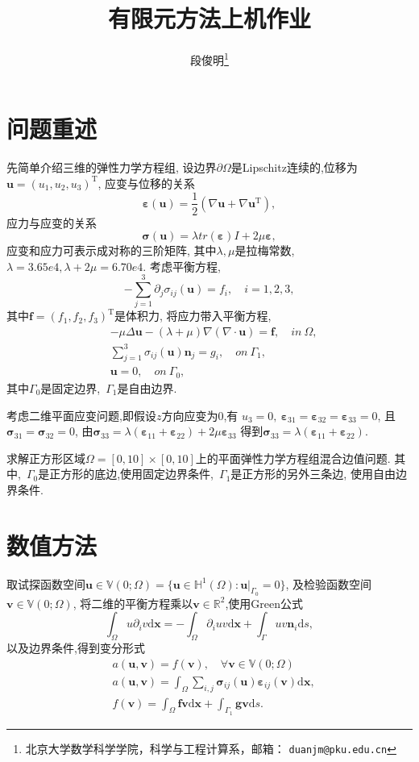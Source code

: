 \documentclass[a4paper, 11pt]{ctexart}
\title{有限元方法上机作业}
\newcommand\bu{\boldsymbol{u}}
\newcommand\bv{\boldsymbol{v}}
\newcommand\bx{\boldsymbol{x}}
\newcommand\bn{\boldsymbol{n}}
\newcommand\bg{\boldsymbol{g}}
\newcommand\dd{\mathrm{d}}
\newcommand\bbR{\mathbb{R}}
\newcommand\bbV{\mathbb{V}}
\newcommand\bbH{\mathbb{H}}
\newcommand\beps{\bm{\varepsilon}}
\newcommand\bsig{\bm{\sigma}}
\newcommand\trace[1]{tr(#1)}
\begin{document}
\author{段俊明\thanks{北京大学数学科学学院，科学与工程计算系，邮箱： {\tt duanjm@pku.edu.cn}}
}
\maketitle

\section{问题重述}
先简单介绍三维的弹性力学方程组,
设边界$\partial\Omega$是Lipschitz连续的,位移为$\bu=(u_1,u_2,u_3)^\mathrm{T}$,
应变与位移的关系
\begin{equation}
  \beps(\bu)=\frac12(\nabla\bu+\nabla\bu^{\mathrm{T}}),
\end{equation}
应力与应变的关系
\begin{equation}
  \bsig(\bu)=\lambda\trace{\beps}I+2\mu\beps,
\end{equation}
应变和应力可表示成对称的三阶矩阵,
其中$\lambda,\mu$是拉梅常数,~$\lambda=3.65e4,\lambda+2\mu=6.70e4$.
考虑平衡方程,
\begin{equation}
  -\sum\limits_{j=1}^3 \partial_j\sigma_{ij}(\bu)=f_i,\quad i=1,2,3,
  \label{eq:balance}
\end{equation}
其中$\boldsymbol{f}=(f_1,f_2,f_3)^\mathrm{T}$是体积力,
将应力带入平衡方程,
\begin{align}
  &-\mu\Delta\bu-(\lambda+\mu)\nabla(\nabla\cdot\bu)=\boldsymbol{f},\quad in~\Omega,\\
  &\sum\limits_{j=1}^3 \sigma_{ij}(\bu)\bn_j=g_i,\quad on~\Gamma_1,\\
  &\bu=0,\quad on~\Gamma_0,
\end{align}
其中$\Gamma_0$是固定边界,~$\Gamma_1$是自由边界.

考虑二维平面应变问题,即假设$z$方向应变为0,有
$u_3=0,~\beps_{31}=\beps_{32}=\beps_{33} =0$,
且$\bsig_{31}=\bsig_{32}=0$,
由$\bsig_{33}=\lambda(\beps_{11}+\beps_{22})+2\mu\beps_{33}$
得到$\bsig_{33}=\lambda(\beps_{11}+\beps_{22})$.

求解正方形区域$\Omega=[0,10]\times[0,10]$上的平面弹性力学方程组混合边值问题.
其中,~$\Gamma_0$是正方形的底边,使用固定边界条件,~$\Gamma_1$是正方形的另外三条边,
使用自由边界条件.

\section{数值方法}
取试探函数空间$\bu\in\bbV(0;\Omega)=\{\bu\in\bbH^1(\Omega):\bu|_{\Gamma_0}=0\}$,
及检验函数空间$\bv\in\bbV(0;\Omega)$,
将二维的平衡方程乘以$\bv\in{\bbR^2}$,使用Green公式
\begin{equation}
  \int_{\Omega}u\partial_i v\dd \bx=-\int_{\Omega}\partial_i uv\dd
  \bx+\int_{\Gamma}uv\bn_i\dd s,
\end{equation}
以及边界条件,得到变分形式
\begin{align}
  &a(\bu,\bv) = f(\bv),\quad\forall \bv\in\bbV(0;\Omega)\\
  &a(\bu,\bv) = \int_\Omega \sum_{i,j}\bsig_{ij}(\bu)\beps_{ij}(\bv)\dd\bx, \\
  &f(\bv) = \int_\Omega \boldsymbol{f}\bv\dd \bx + \int_{\Gamma_1}\bg\bv\dd s.
\end{align}
\end{document}
